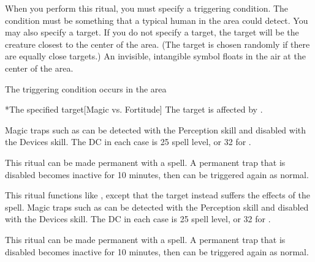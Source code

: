 \spellspecial When you perform this ritual, you must specify a triggering condition. The condition must be something that a typical human in the area could detect. You may also specify a target. If you do not specify a target, the target will be the creature closest to the center of the area. (The target is chosen randomly if there are equally close targets.)
\spellline
\spelleffect An invisible, intangible symbol floats in the air at the center of the area.
\begin{spelltrigger}{The triggering condition occurs in the area}
    \begin{spelltarget}*{The specified target}[Magic vs. Fortitude]
        \spellsuccess The target is affected by .
    \end{spelltarget}
\end{spelltrigger}

\spellnotes Magic traps such as  can be detected with the Perception skill and disabled with the Devices skill. The DC in each case is 25 \add spell level, or 32 for .
\par This ritual can be made permanent with a  spell. A permanent trap that is disabled becomes inactive for 10 minutes, then can be triggered again as normal.

\spellspecial This ritual functions like , except that the target instead suffers the effects of the  spell.
\spellnotes Magic traps such as  can be detected with the Perception skill and disabled with the Devices skill. The DC in each case is 25 \add spell level, or 32 for .
\par This ritual can be made permanent with a  spell. A permanent trap that is disabled becomes inactive for 10 minutes, then can be triggered again as normal.

\begin{comment}
\spellsection{Symbol of Fear}{7}
\spellinfo{Abjuration/Enchantment (Emotion, Warding) [Fear, Mind-Affecting, Trap]}{Arcane}
\spellsr{Yes}
\spellattack{Will negates}
\spelleffect This spell functions like \spell{symbol of death}, except that the triggering creature instead suffers the effects of the \spell{terror} spell.
\spellnotes Magic traps such as \spell{symbol of terror} can be detected with the Perception skill and disabled with the Devices skill. The DC in each case is 25 \add spell level, or 32 for \spell{symbol of terror}.
\ritualcost*{7}
\end{comment}

